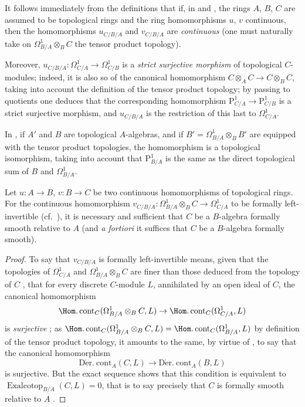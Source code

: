 \begin{env}[20.7.1]
\label{0.20.7.1}
It follows immediately from the definitions that if, in  and , the rings $A$, $B$, $C$ are assumed to be topological rings and the ring homomorphisms $u$, $v$ continuous, then the homomorphisms $u_{C/B/A}$ and $v_{C/B/A}$ are \emph{continuous} (one must naturally take on $\Omega^1_{B/A}\otimes_B C$ the tensor product topology).

Moreover, $u_{C/B/A}:\Omega^1_{C/A}\to\Omega^1_{C/B}$ is a \emph{strict surjective morphism} of topological $C$-modules; indeed, it is also so of the canonical homomorphism $C\otimes_A C\to C\otimes_B C$, taking into account the definition of the tensor product topology; by passing to quotients one deduces that the corresponding homomorphism $\mathrm{P}^1_{C/A}\to\mathrm{P}^1_{C/B}$ is a strict surjective morphism, and $u_{C/B/A}$ is the restriction of this last to $\Omega^1_{C/A}$.

In , if $A'$ and $B$ are topological $A$-algebras, and if $B'=\Omega^1_{B/A}\otimes_B B'$ are equipped with the tensor product topologies, the homomorphism  is a topological isomorphism, taking into account that $\mathrm{P}^1_{B/A}$ is the same as the direct topological sum of $B$ and $\Omega^1_{B/A}$.
\end{env}

\begin{proposition}[20.7.2]
\label{0.20.7.2}
Let $u:A\to B$, $v:B\to C$ be two continuous homomorphisms of topological rings.
For the continuous homomorphism $v_{C/B/A}:\Omega^1_{B/A}\otimes_B C\to\Omega^1_{C/A}$ to be formally left-invertible \textup{(}cf.\ \textup{)}, it is necessary and sufficient that $C$ be a $B$-algebra formally smooth relative to $A$  \textup{(}and \emph{a fortiori} it suffices that $C$ be a $B$-algebra formally smooth\textup{)}.
\end{proposition}

\begin{proof}
To say that $v_{C/B/A}$ is formally left-invertible means, given that the topologies of $\Omega^1_{C/A}$ and $\Omega^1_{B/A}\otimes_B C$ are finer than those deduced from the topology of $C$ , that for every discrete $C$-module $L$, annihilated by an open ideal of $C$, the canonical homomorphism
\[
  \Hom.\operatorname{cont}_C(\Omega^1_{B/A}\otimes_B C,L)\to\Hom.\operatorname{cont}_C(\Omega^1_{C/A},L)
\]
is \emph{surjective} ; as $\Hom.\operatorname{cont}_C(\Omega^1_{B/A}\otimes_B C,L)=\Hom.\operatorname{cont}_C(\Omega^1_{B/A},L)$ by definition of the tensor product topology, it amounts to the same, by virtue of , to say that the canonical homomorphism
\[
  \operatorname{D\acute{e}r.\ cont}_A(C,L)\to\operatorname{D\acute{e}r.\ cont}_A(B,L)
\]
is surjective.
But the exact sequence  shows that this condition is equivalent to $\operatorname{Exalcotop}_{B/A}(C,L)=0$, that is to say precisely that $C$ is formally smooth relative to $A$ .
\end{proof}

